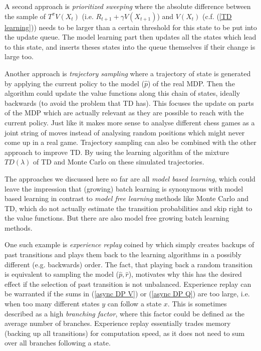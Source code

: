 A second approach is \emph{prioritized sweeping} where the absolute difference between the sample of \(T^\pi V(X_t)\) (i.e. \(R_{t+1}+\gamma V(X_{t+1})\)) and \(V(X_t)\) (c.f. (\ref{TD learning})) needs to be larger than a certain threshold for this state to be put into the update queue. The model learning part then updates all the states which lead to this state, and inserts theses states into the queue themselves if their change is large too. 

Another approach is \emph{trajectory sampling} where a trajectory of state is generated by applying the current policy to the model (\(\hat{p}\)) of the real MDP. Then the algorithm could update the value functions along this chain of states, ideally backwards (to avoid the problem that TD has). This focuses the update on parts of the MDP which are actually relevant as they are possible to reach with the current policy. Just like it makes more sense to analyse different chess games as a joint string of moves instead of analysing random positions which might never come up in a real game. Trajectory sampling can also be combined with the other approach to improve TD. By using the learning algorithm of the mixture \(TD(\lambda)\) of TD and Monte Carlo on these simulated trajectories. 

The approaches we discussed here so far are all \emph{model based learning}, which could leave the impression that (growing) batch learning is synonymous with model based learning in contrast to \emph{model free learning} methods like Monte Carlo and TD, which do not actually estimate the transition probabilities and skip right to the value functions. But there are also model free growing batch learning methods. 

One such example is \emph{experience replay} coined by \textcite{linSelfimprovingReactiveAgents1992} which simply creates backups of past transitions and plays them back to the learning algorithms in a possibly different (e.g. backwards) order. The fact, that playing back a random transition is equivalent to sampling the model (\(\hat{p}, \hat{r}\)), motivates why this has the desired effect if the selection of past transition is not unbalanced.  Experience replay can be warranted if the sums in (\ref{async DP V}) or (\ref{async DP Q}) are too large, i.e. when too many different states \(y\) can follow a state \(x\). This is sometimes described as a high \emph{branching factor}, where this factor could be defined as the average number of branches. Experience replay essentially trades memory (backing up all transitions) for computation speed, as it does not need to sum over all branches following a state.

